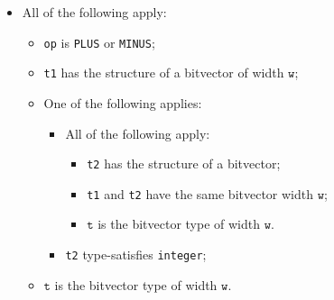 \documentclass{book}
\newcommand\vt[0]{\texttt{t}}
\newcommand\vw[0]{\texttt{w}}
\begin{document}
\begin{itemize}
  \item All of the following apply:
    \begin{itemize}
    \item \texttt{op} is \texttt{PLUS} or \texttt{MINUS};
    \item \texttt{t1} has the structure of a bitvector of width $\vw$;
    \item One of the following applies:
      \begin{itemize}
	    \item All of the following apply:
          \begin{itemize}
		    \item \texttt{t2} has the structure of a bitvector;
    		\item \texttt{t1} and \texttt{t2} have the same bitvector width $\vw$;
    		\item $\vt$ is the bitvector type of width $\vw$.
          \end{itemize}
    	\item \texttt{t2} type-satisfies \texttt{integer};
      \end{itemize}
    \item $\vt$ is the bitvector type of width $\vw$.
    \end{itemize}


\end{itemize}
\end{document}
